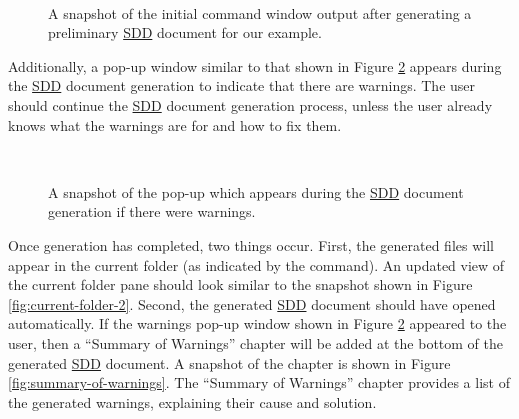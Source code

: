 \documentclass{mcscert}
\begin{document}
\begin{figure}
	\caption{A snapshot of the initial command window output after generating a	preliminary \hyperref[acr:sdd]{SDD} document for our example.}
	\centering
	\label{fig:gen-1}
	\\
\end{figure}

Additionally, a pop-up window similar to that shown in Figure \ref{fig:warning-pop-up} appears during the \hyperref[acr:sdd]{SDD} document generation to indicate
that there are warnings. 
The user should continue the \hyperref[acr:sdd]{SDD} document generation process, unless the user already knows what the warnings are for and how to fix them.

\begin{figure}
	\caption{A snapshot of the pop-up which appears during the \hyperref[acr:sdd]{SDD} document	generation if there were warnings.}
	\centering
	\label{fig:warning-pop-up}
	\\
\end{figure}

Once generation has completed, two things occur. 
First, the generated files will appear in the current folder (as indicated by the  command). 
An updated view of the current folder pane should look similar to the snapshot shown in Figure \ref{fig:current-folder-2}. 
Second, the generated \hyperref[acr:sdd]{SDD} document should have opened automatically. 
If the warnings pop-up window shown in Figure \ref{fig:warning-pop-up} appeared to the user, then a ``Summary of Warnings'' chapter will be added at the bottom of the generated \hyperref[acr:sdd]{SDD} document. 
A snapshot of the chapter is shown in Figure \ref{fig:summary-of-warnings}. 
The ``Summary of Warnings'' chapter provides a list of the generated warnings, explaining their cause and solution.
\end{document}
